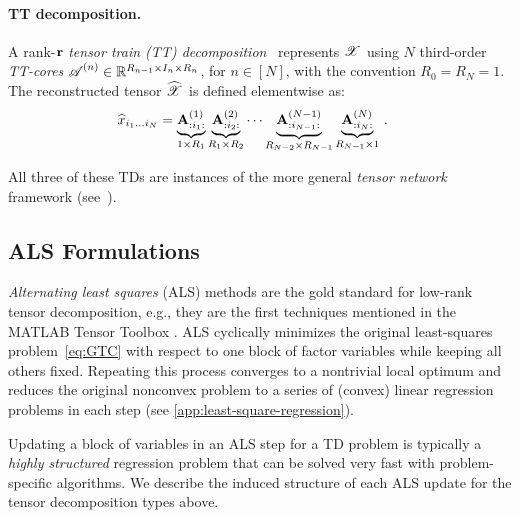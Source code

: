 \paragraph{TT decomposition.}
A rank-$\mathbf{r}$ \emph{tensor train (TT) decomposition}~\citep{oseledets2011tensor} represents $\bm{\mathscr{X}}$
using $N$ third-order \emph{TT-cores} $\bm{\mathscr{A}}^{(n)}\in \mathbb{R}^{R_{n-1}\times I_n\times R_n}$, for $n\in[N]$, with the convention $R_0 = R_N = 1$.
The reconstructed tensor $\widehat{\bm{\mathscr{X}}}$ is defined elementwise as:
\begin{align*}
    \widehat{x}_{i_1 \ldots i_N}
    &= \underbrace{\mathbf{A}^{(1)}_{:i_1:}}_{1\times R_1}
       \underbrace{\mathbf{A}^{(2)}_{:i_2:}}_{R_1\times R_2}
       \cdots
       \underbrace{\mathbf{A}^{(N-1)}_{:i_{N-1}:}}_{R_{N-2}\times R_{N-1}}
       \underbrace{\mathbf{A}^{(N)}_{:i_N:}}_{R_{N-1}\times 1}\,.
\end{align*}

\begin{remark}
All three of these TDs are instances of the more general \emph{tensor network} framework (see~).
\end{remark}

\subsection{ALS Formulations}
\label{subsec:ALS-for-different-TDs}

\emph{Alternating least squares} (ALS) methods are the gold standard for low-rank tensor decomposition, e.g., they are the first techniques mentioned in the MATLAB Tensor Toolbox \citep{matlab}.
ALS cyclically minimizes the original least-squares problem~\eqref{eq:GTC} with respect to one block of factor variables while keeping all others fixed.
Repeating this process converges to a nontrivial local optimum
and reduces the original nonconvex problem to a series of (convex) linear regression problems in each step (see \cref{app:least-square-regression}).

Updating a block of variables in an ALS step for a TD problem
is typically a \emph{highly structured} regression problem
that can be solved very fast with problem-specific algorithms.
We describe the induced structure of each ALS update for the tensor decomposition types above.

